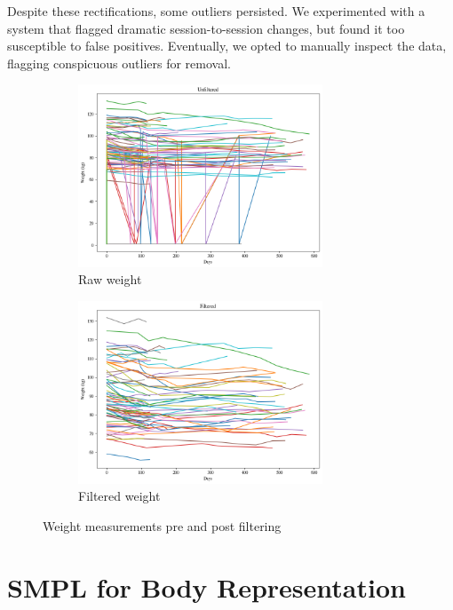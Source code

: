 Despite these rectifications, some outliers persisted. We experimented with a
system that flagged dramatic session-to-session changes, but found it too
susceptible to false positives. Eventually, we opted to manually inspect the
data, flagging conspicuous outliers for removal.

\begin{figure}[h]
    \centering
    \begin{subfigure}{\textwidth}
        \centering
        \includegraphics[width=0.8\textwidth]{files/weight_unfiltered}
        \caption{Raw weight}
    \end{subfigure}
    \begin{subfigure}{\textwidth}
        \centering
        \includegraphics[width=0.8\textwidth]{files/weight_filtered}
        \caption{Filtered weight}
    \end{subfigure}
    \caption{Weight measurements pre and post filtering}
\end{figure}

\section{SMPL for Body Representation}

